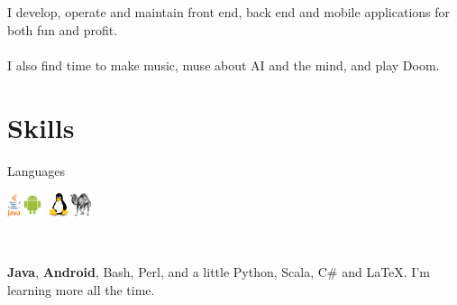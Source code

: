 \documentclass[10pt]{article} %
\newenvironment{indented}[1]%
{\begin{list}{}%
  {\setlength{\leftmargin}{#1}}%
  \item[]%
}
{\end{list}}
\begin{document}
\begin{minipage}[t]{0.5\textwidth}
\vspace{0pt} %
	

\normalsize{I develop, operate and maintain front end, back end and mobile applications for both fun and profit.
\\\\I also find time to make music, muse about AI and the mind, and play Doom.}\\


\section{Skills}



{\raggedright\large Languages\hspace{5pt}\parbox[top][10pt][c]{100pt}{\includegraphics[height=20pt]{res/java}\includegraphics[height=20pt]{res/android}
\includegraphics[height=20pt]{res/tux}\includegraphics[height=20pt]{res/perl.jpg}}\\}


\begin{indented}{1cm}
\normalsize{\textbf{Java}, \textbf{Android}, Bash, Perl, and a little Python, Scala, C\# and \LaTeX. I'm learning more all the time.}
\end{indented}


\end{minipage}
\end{document}
